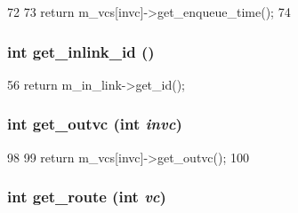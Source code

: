 \begin{DoxyCode}
72     {
73         return m_vcs[invc]->get_enqueue_time();
74     }
\end{DoxyCode}
\hypertarget{classInputUnit__d_a9fd25c2e12a027c97fcc54d09ee2971f}{
\subsubsection[{get\_\-inlink\_\-id}]{\setlength{\rightskip}{0pt plus 5cm}int get\_\-inlink\_\-id ()}}
\label{classInputUnit__d_a9fd25c2e12a027c97fcc54d09ee2971f}



\begin{DoxyCode}
56 { return m_in_link->get_id(); }
\end{DoxyCode}
\hypertarget{classInputUnit__d_a3b298665e4de7737f33ebef9d87a0762}{
\subsubsection[{get\_\-outvc}]{\setlength{\rightskip}{0pt plus 5cm}int get\_\-outvc (int {\em invc})}}
\label{classInputUnit__d_a3b298665e4de7737f33ebef9d87a0762}



\begin{DoxyCode}
98     {
99         return m_vcs[invc]->get_outvc();
100     }
\end{DoxyCode}
\hypertarget{classInputUnit__d_a98ae815c1cb608efc87754d70f735691}{
\subsubsection[{get\_\-route}]{\setlength{\rightskip}{0pt plus 5cm}int get\_\-route (int {\em vc})}}
\label{classInputUnit__d_a98ae815c1cb608efc87754d70f735691}



